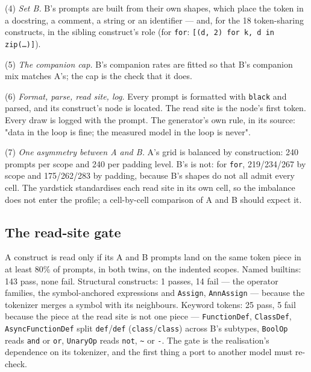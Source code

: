 \documentclass{article}
\begin{document}
(4) \emph{Set B.} B's prompts are built from their own shapes, which place the token in a docstring, a comment, a string or an identifier --- and, for the 18 token-sharing constructs, in the sibling construct's role (for \texttt{for}: \texttt{[(d, 2) for k, d in zip(\ldots{})]}).

(5) \emph{The companion cap.} B's companion rates are fitted so that B's companion mix matches A's; the cap is the check that it does.

(6) \emph{Format, parse, read site, log.} Every prompt is formatted with \texttt{black} and parsed, and its construct's node is located. The read site is the node's first token. Every draw is logged with the prompt. The generator's own rule, in its source: "data in the loop is fine; the measured model in the loop is never".

(7) \emph{One asymmetry between A and B.} A's grid is balanced by construction: 240 prompts per scope and 240 per padding level. B's is not: for \texttt{for}, 219/234/267 by scope and 175/262/283 by padding, because B's shapes do not all admit every cell. The yardstick standardises each read site in its own cell, so the imbalance does not enter the profile; a cell-by-cell comparison of A and B should expect it.

\subsection{The read-site gate}

A construct is read only if its A and B prompts land on the same token piece in at least 80\% of prompts, in both twins, on the indented scopes. Named builtins: 143 pass, none fail. Structural constructs: 1 passes, 14 fail --- the operator families, the symbol-anchored expressions and \texttt{Assign}, \texttt{AnnAssign} --- because the tokenizer merges a symbol with its neighbours. Keyword tokens: 25 pass, 5 fail because the piece at the read site is not one piece --- \texttt{FunctionDef}, \texttt{ClassDef}, \texttt{AsyncFunctionDef} split \texttt{\textvisiblespace{}def}/\texttt{def} (\texttt{\textvisiblespace{}class}/\texttt{class}) across B's subtypes, \texttt{BoolOp} reads \texttt{\textvisiblespace{}and} or \texttt{\textvisiblespace{}or}, \texttt{UnaryOp} reads \texttt{\textvisiblespace{}not}, \texttt{\textvisiblespace{}\textasciitilde{}} or \texttt{\textvisiblespace{}-}. The gate is the realisation's dependence on its tokenizer, and the first thing a port to another model must re-check.
\end{document}
